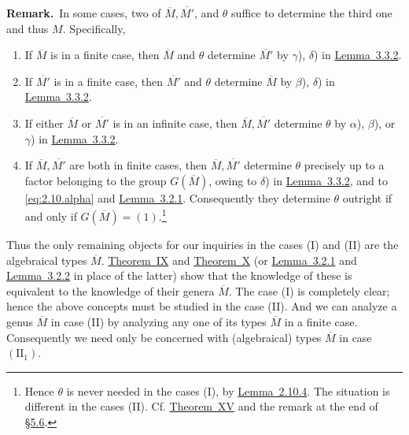 \documentclass[b5paper,twoside]{article}
\newcommand{\secref}[2]{\hyperref[#1]{\mbox{\S#2}}}
\newcommand{\thmref}[2]{\hyperref[#1]{\mbox{Theorem~#2}}}
\newcommand{\lemref}[2]{\hyperref[#1]{\mbox{Lemma~#2}}}
\theoremstyle{mvnplain}
\newcommand{\M}{\mathbf M}
\def\M{M}%
\def\widetilde#1{#1}%
\def\mathfrak#1{#1}%
\begin{document}
\par{}
\noindent\textbf{Remark.}\ 
In some cases, two of \(\overline{\M},\overline{\M'}\), and \(\theta\)
suffice to determine the third one and thus \(\widetilde{\M}\). Specifically,
\begin{enumerate}[label={}]
\item[\(\alpha\))] If \(\overline{\M}\) is in a finite case, then \(\overline{\M}\) and
\(\theta\) determine \(\overline{\M'}\) by \(\gamma\)), \(\delta\)) in
\lemref{lem:3.3.2}{3.3.2}.
\item[\(\beta\))] If \(\overline{\M'}\) is in a finite case, then \(\overline{\M'}\) and
\(\theta\) determine \(\overline{\M}\) by \(\beta\)), \(\delta\)) in
\lemref{lem:3.3.2}{3.3.2}.
\item[\(\gamma\))] If either \(\overline{\M}\) or \(\overline{\M'}\) is in an infinite
case, then \(\overline{\M},\overline{\M'}\) determine \(\theta\) by
\(\alpha\)), \(\beta\)), or \(\gamma\)) in \lemref{lem:3.3.2}{3.3.2}.
\item[\(\delta\))] If \(\overline{\M},\overline{\M'}\) are both in finite cases, then
\(\overline{\M},\overline{\M'}\) determine \(\theta\) precisely up to a
factor belonging to the group
\(\mathfrak G(\widetilde{\overline{\M}})\), owing to \(\delta\)) in
\lemref{lem:3.3.2}{3.3.2}, and to \eqref{eq:2.10.alpha} and
\lemref{lem:3.2.1}{3.2.1}. Consequently they determine \(\theta\) outright if
and only if \(\mathfrak G(\widetilde{\overline{\M}})=(1)\).\footnote{Hence
\(\theta\) is never needed in the cases (I), by
\lemref{lem:2.10.4}{2.10.4}. The situation is different in the cases (II).
Cf. \thmref{thm:XV}{XV} and the remark at the end of \secref{sec:5.6}{5.6}.}
\end{enumerate}
\par{}

Thus the only remaining objects for our inquiries in the cases (I) and (II)
are the algebraical types \(\overline{\M}\). \thmref{thm:IX}{IX} and
\thmref{thm:X}{X} (or \lemref{lem:3.2.1}{3.2.1} and
\lemref{lem:3.2.2}{3.2.2} in place of the latter) show that the knowledge of
these is equivalent to the knowledge of their genera
\(\widetilde{\overline{\M}}\). The case (I) is completely clear; hence the
above concepts must be studied in the case (II). And we can analyze a genus
\(\widetilde{\overline{\M}}\) in case (II) by analyzing any one of its types
\(\overline{\M}\) in a finite case. Consequently we need only be concerned
with (algebraical) types \(\overline{\M}\) in case \((\mathrm {II}_1)\).
\end{document}
